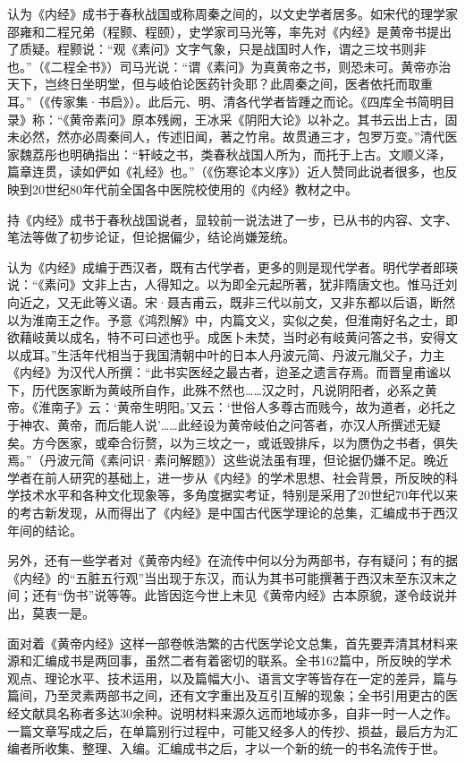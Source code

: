 \documentclass[draft,12pt]{ctexbook}
\begin{document}
认为《内经》成书于春秋战国或称周秦之间的，以文史学者居多。如宋代的理学家邵雍和二程兄弟（程颢、程颐），史学家司马光等，率先对《内经》是黄帝书提出了质疑。程颢说：“观《素问》文字气象，只是战国时人作，谓之三坟书则非也。”（《二程全书》）司马光说：“谓《素问》为真黄帝之书，则恐未可。黄帝亦治天下，岂终日坐明堂，但与岐伯论医药针灸耶？此周秦之间，医者依托而取重耳。”（《传家集·书启》）。此后元、明、清各代学者皆踵之而论。《四库全书简明目录》称：“《黄帝素问》原本残阙，王冰采《阴阳大论》以补之。其书云出上古，固未必然，然亦必周秦间人，传述旧闻，著之竹帛。故贯通三才，包罗万变。”清代医家魏荔彤也明确指出：“轩岐之书，类春秋战国人所为，而托于上古。文顺义泽，篇章连贯，读如俨如《礼经》也。”（《伤寒论本义序》）近人赞同此说者很多，也反映到20世纪80年代前全国各中医院校使用的《内经》教材之中。

持《内经》成书于春秋战国说者，显较前一说法进了一步，已从书的内容、文字、笔法等做了初步论证，但论据偏少，结论尚嫌笼统。

认为《内经》成编于西汉者，既有古代学者，更多的则是现代学者。明代学者郎瑛说：“《素问》文非上古，人得知之。以为即全元起所著，犹非隋唐文也。惟马迁刘向近之，又无此等义语。宋·聂吉甫云，既非三代以前文，又非东都以后语，断然以为淮南王之作。予意《鸿烈解》中，内篇文义，实似之矣，但淮南好名之士，即欲藉岐黄以成名，特不可曰述也乎。成医卜未焚，当时必有岐黄问答之书，安得文以成耳。”生活年代相当于我国清朝中叶的日本人丹波元简、丹波元胤父子，力主《内经》为汉代人所撰：“此书实医经之最古者，迨圣之遗言存焉。而晋皇甫谧以下，历代医家断为黄岐所自作，此殊不然也……汉之时，凡说阴阳者，必系之黄帝。《淮南子》云：‘黄帝生明阳。’又云：‘世俗人多尊古而贱今，故为道者，必托之于神农、黄帝，而后能人说’……此经设为黄帝岐伯之问答者，亦汉人所撰述无疑矣。方今医家，或牵合衍赘，以为三坟之一，或诋毁排斥，以为赝伪之书者，俱失焉。”（丹波元简《素问识·素问解题》）这些说法虽有理，但论据仍嫌不足。晚近学者在前人研究的基础上，进一步从《内经》的学术思想、社会背景，所反映的科学技术水平和各种文化现象等，多角度据实考证，特别是采用了20世纪70年代以来的考古新发现，从而得出了《内经》是中国古代医学理论的总集，汇编成书于西汉年间的结论。

另外，还有一些学者对《黄帝内经》在流传中何以分为两部书，存有疑问；有的据《内经》的“五脏五行观”当出现于东汉，而认为其书可能撰著于西汉末至东汉末之间；还有“伪书”说等等。此皆因迄今世上未见《黄帝内经》古本原貌，遂令歧说并出，莫衷一是。

面对着《黄帝内经》这样一部卷帙浩繁的古代医学论文总集，首先要弄清其材料来源和汇编成书是两回事，虽然二者有着密切的联系。全书162篇中，所反映的学术观点、理论水平、技术运用，以及篇幅大小、语言文字等皆存在一定的差异，篇与篇间，乃至灵素两部书之间，还有文字重出及互引互解的现象；全书引用更古的医经文献具名称者多达30余种。说明材料来源久远而地域亦多，自非一时一人之作。一篇文章写成之后，在单篇别行过程中，可能又经多人的传抄、损益，最后方为汇编者所收集、整理、入编。汇编成书之后，才以一个新的统一的书名流传于世。
\end{document}
